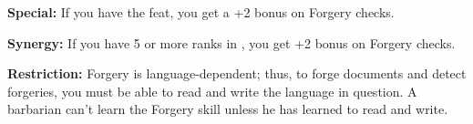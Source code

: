 \textbf{Special:} If you have the  feat, you get a +2 bonus on Forgery checks.

\textbf{Synergy:} If you have 5 or more ranks in , you get +2 bonus on Forgery checks.

\textbf{Restriction:} Forgery is language-dependent; thus, to forge documents and detect forgeries, you must be able to read and write the language in question. A barbarian can't learn the Forgery skill unless he has learned to read and write.